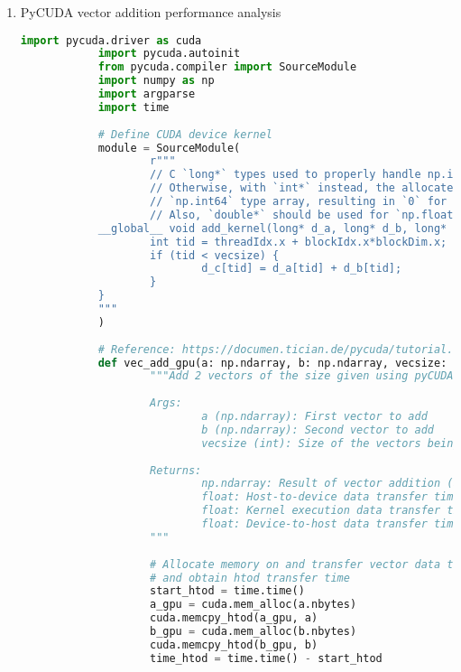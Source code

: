\documentclass[11pt,twoside]{article}
\begin{document}
\begin{enumerate}
		!gridDim.x=2, gridDim.y=2, gridDim.z=2!\\
		!0<=blockId.x<=1, 0<=blockId.y<=1, 0<=blockId.z<=1!
		\\ \hbox{} \\
		\underline{\textit{Active learning problem 5}}
		\par\indent !dim3 dimThreads(16,16,16);!
		\par\indent Values of pertinent variables:\\
		!blockDim.x=16, blockDim.y=16, blockDim.z=16!\\
		!0<=threadIdx.x<=15, 0<=threadIdx.y<=15, 0<=threadIdx.z<=15!
	\pagebreak
  \item PyCUDA vector addition performance analysis
		\begin{lstlisting}[language=Python,caption={Comparing vector addition using the CPU vs. the GPU with pyCUDA},stepnumber=2]
			import pycuda.driver as cuda
			import pycuda.autoinit
			from pycuda.compiler import SourceModule
			import numpy as np
			import argparse
			import time
			
			# Define CUDA device kernel
			module = SourceModule(
					r"""
					// C `long*` types used to properly handle np.int64 arrays!
					// Otherwise, with `int*` instead, the allocated memory boundaries overlap with individual elements in the
					// `np.int64` type array, resulting in `0` for every other entry in `a` and `b`!
					// Also, `double*` should be used for `np.float64` arrays!
			__global__ void add_kernel(long* d_a, long* d_b, long* d_c, int vecsize) {
					int tid = threadIdx.x + blockIdx.x*blockDim.x; // Get id for current thread on GPU
					if (tid < vecsize) {
							d_c[tid] = d_a[tid] + d_b[tid];
					}
			}
			"""
			)
			
			# Reference: https://documen.tician.de/pycuda/tutorial.html 
			def vec_add_gpu(a: np.ndarray, b: np.ndarray, vecsize: int):
					"""Add 2 vectors of the size given using pyCUDA on the device's Nvidia GPU selected
			
					Args:
							a (np.ndarray): First vector to add
							b (np.ndarray): Second vector to add
							vecsize (int): Size of the vectors being added
			
					Returns:
							np.ndarray: Result of vector addition (a+b) on the GPU
							float: Host-to-device data transfer time
							float: Kernel execution data transfer time
							float: Device-to-host data transfer time
					"""
			
					# Allocate memory on and transfer vector data to the GPU device and
					# and obtain htod transfer time
					start_htod = time.time()
					a_gpu = cuda.mem_alloc(a.nbytes)
					cuda.memcpy_htod(a_gpu, a)
					b_gpu = cuda.mem_alloc(b.nbytes)
					cuda.memcpy_htod(b_gpu, b)
					time_htod = time.time() - start_htod
			

\end{lstlisting}
\end{enumerate}
\end{document}
